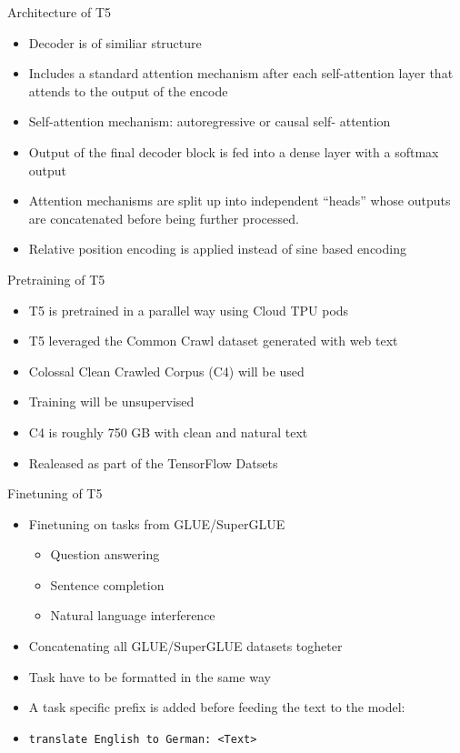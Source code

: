 \documentclass[english]{mlutalk}
\begin{document}
\begin{frame}{Architecture of T5}
  \begin{itemize}
    \item Decoder is of similiar structure
    \item Includes a standard attention mechanism after each self-attention layer that attends to the output of the encode
    \item Self-attention mechanism: autoregressive or causal self-
    attention
    \item Output of the final decoder block is fed into a dense layer with a softmax output
    \item Attention mechanisms are split up into
    independent “heads” whose outputs are concatenated before being further processed.
    \item Relative position encoding is applied instead of sine based encoding
  \end{itemize}
\end{frame}

\begin{frame}{Pretraining of T5}
  \begin{itemize}
    \item T5 is pretrained in a parallel way using Cloud TPU pods
    \item T5 leveraged the Common Crawl dataset generated with web text
    \item Colossal Clean Crawled Corpus (C4) will be used
    \item Training will be unsupervised
    \item C4 is roughly 750 GB with clean and natural text
    \item Realeased as part of the TensorFlow Datsets
  \end{itemize}
\end{frame}

\begin{frame}{Finetuning of T5}
    \begin{itemize}
      \item Finetuning on tasks from GLUE/SuperGLUE
      \begin{itemize}
        \item Question answering
        \item Sentence completion
        \item Natural language interference
      \end{itemize}
      \item Concatenating all GLUE/SuperGLUE datasets togheter
      \item Task have to be formatted in the same way
      \item A task specific prefix is added before feeding the text to the model:
      \item \texttt{translate English to German: <Text>}
    \end{itemize}
\end{frame}
\end{document}
